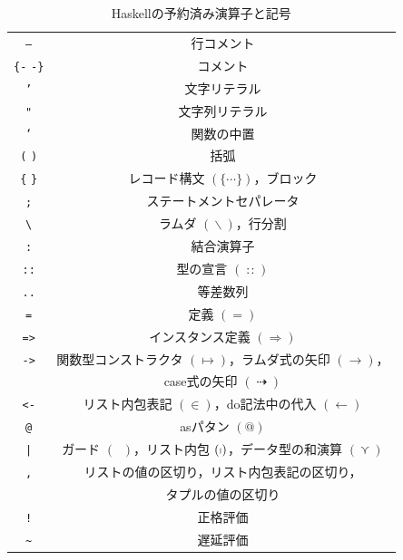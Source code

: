 \documentclass[a5paper,twoside,fleqn,draft]{jsbook}
\newcommand{\programminglanguage}[1]{\textsf{#1}}
\newcommand{\haskell}{\programminglanguage{Haskell}}
\newcommand{\code}[1]{\texttt{#1}}
\DeclareMathOperator{\mSuperClass}{\Rightarrow}
\DeclareMathOperator{\mDoEq}{\leftarrow}
\DeclareMathOperator{\mFrom}{\in}
\DeclareMathOperator{\mIfSo}{\dashrightarrow}
\DeclareMathOperator{\mIn}{{:\!:}}
\DeclareMathOperator{\mLambda}{\backslash}
\DeclareMathOperator{\mValueOr}{\curlyvee}
\newcommand{\mGuard}[1]{\mathop{\mid_{#1}}}
\DeclareMathOperator{\mListComp}{\shortmid}
\begin{document}
\begin{table}
\caption{\haskell の予約済み演算子と記号}
\label{tab:reserved-symbols}
\begin{center}
\begin{tabular}{||c|c||}
\hline
\code{--}&行コメント\\
\code{\{-} \code{-\}}&コメント\\
\hline
\code{'}&文字リテラル\\
\code{"}&文字列リテラル\\%
\code{`}&関数の中置\\
\code{(} \code{)}&括弧\\
\code{\{} \code{\}}&レコード構文 $(\{\dotsb\})$，ブロック\\
\code{;}&ステートメントセパレータ\\
\hline
\code{\textbackslash}&ラムダ $(\mLambda)$，行分割\\
\code{:}&結合演算子\\
\code{::}&型の宣言 $(\mIn)$\\
\code{..}&等差数列\\
\code{=}&定義 $(=)$\\
\code{=>}&インスタンス定義 $(\mSuperClass)$\\
\code{->}&関数型コンストラクタ $(\mapsto)$，ラムダ式の矢印 $(\rightarrow)$，\\
&case式の矢印 $(\mIfSo)$\\
\code{<-}&リスト内包表記 $(\mFrom)$，do記法中の代入 $(\mDoEq)$\\
\code{@}&asパタン $(@)$\\
\code{|}&ガード $(\mGuard{})$，リスト内包 $(\mListComp)$，データ型の和演算 $(\mValueOr)$\\
\code{,}&リストの値の区切り，リスト内包表記の区切り，\\
&タプルの値の区切り\\
\hline
\code{!}&正格評価\\
\code{\textasciitilde}&遅延評価\\
\hline
\end{tabular}
\end{center}
\end{table}
\end{document}
